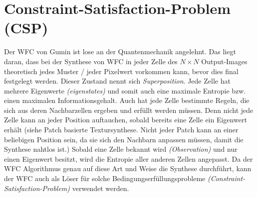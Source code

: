 \documentclass[12pt, a4paper,twoside,openright]{report} %
\begin{document}
\section{Constraint-Satisfaction-Problem {(CSP)}}

Der WFC von Gumin ist lose an der Quantenmechanik angelehnt.
Das liegt daran, dass bei der Synthese von WFC in jeder Zelle des $N\times N$ Output-Images theoretisch jedes Muster / jeder Pixelwert vorkommen kann, bevor dies final festgelegt werden.
Dieser Zustand nennt sich \textit{Superposition}.
Jede Zelle hat mehrere Eigenwerte \textit{(eigenstates)} und somit auch eine maximale Entropie bzw. einen maximalen Informationsgehalt.
Auch hat jede Zelle bestimmte Regeln, die sich aus deren Nachbarzellen ergeben und erfüllt werden müssen.
Denn nicht jede Zelle kann an jeder Position auftauchen, sobald bereits eine Zelle ein Eigenwert erhält
{(siehe Patch basierte Textursynthese. Nicht jeder Patch kann an einer beliebigen Position sein,
da sie sich den Nachbarn anpassen müssen, damit die Synthese nahtlos ist.)}
Sobald eine Zelle bekannt wird \textit{(Observation)} und nur einen Eigenwert besitzt,
wird die Entropie aller anderen Zellen angepasst.
 \cite[S.5, 2.2 The wave function]{Zinkernagel_2016}
Da der WFC Algorithmus genau auf diese Art und Weise die Synthese durchführt,
kann der WFC auch als Löser für solche Bedingungserfüllungsprobleme \textit{(Constraint-Satisfaction-Problem)} verwendet werden.\par
\end{document}

